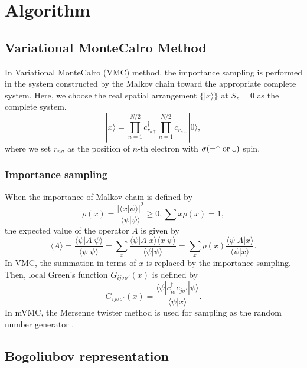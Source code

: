 \chapter{{Algorithm}}
\label{Ch:algorithm}
\section{Variational MonteCalro Method}
In Variational MonteCalro (VMC) method, the importance sampling is performed in the system constructed by the Malkov chain toward the appropriate complete system.
Here, we choose the real spatial arrangement $\{| x\rangle\}$ at $S_z = 0$ as the complete system.
\begin{equation}
| x\rangle =  \prod_{n=1}^{N/2} c_{r_{n\uparrow}}^{\dag} \prod_{n=1}^{N/2} c_{r_{n\downarrow}}^{\dag} |0 \rangle,
\end{equation}
where we set $r_{n\sigma}$ as the position of $n$-th electron with $\sigma (=\uparrow \rm{or} \downarrow)$ spin.

\subsection{Importance sampling}
When the importance of Malkov chain is defined by
\begin{equation}
\rho(x)=\frac{|\langle x| \psi \rangle|^2}{\langle \psi | \psi \rangle} \ge 0, \sum{x} \rho(x)=1,
\end{equation}
the expected value of the operator $A$ is given by
\begin{equation}
\langle A \rangle =\frac{\langle \psi| A| \psi \rangle}{\langle \psi | \psi \rangle} 
=\sum_x \frac{\langle \psi| A | x\rangle \langle x| \psi \rangle}{\langle \psi |\psi \rangle} 
=\sum_x \rho(x) \frac{\langle \psi| A | x\rangle }{\langle \psi |x \rangle} .
\end{equation}
In VMC, the summation in terms of $x$ is replaced by the importance sampling.
Then, local Green's function $G_{ij\sigma\sigma'}(x)$ is defined by
\begin{equation}
G_{ij\sigma\sigma'}(x)=\frac{\langle \psi | c_{i\sigma}^{\dag} c_{j\sigma'} | \psi \rangle}{\langle \psi | x \rangle}.
\end{equation}
In mVMC, the Mersenne twister method is used for sampling as the random number generator \cite{Mutsuo2008}. 

\section{Bogoliubov representation}\label{sec_bogoliubov_rep}

